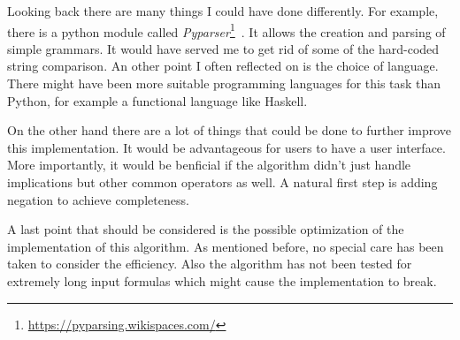 Looking back there are many things I could have done differently. For example, there is a python module called \emph{Pyparser}\footnote{\href{https://pyparsing.wikispaces.com/}{https://pyparsing.wikispaces.com/}}~. It allows the creation and parsing of simple grammars. It would have served me to get rid of some of the hard-coded string comparison. An other point I often reflected on is the choice of language. There might have been more suitable programming languages for this task than Python, for example a functional language like Haskell. 

On the other hand there are a lot of things that could be done to further improve this implementation. It would be advantageous for users to have a user interface. More importantly, it would be benficial if the algorithm didn't just handle implications but other common operators as well. A natural first step is adding negation to achieve completeness.

A last point that should be considered is the possible optimization of the implementation of this algorithm. As mentioned before, no special care has been taken to consider the efficiency. Also the algorithm has not been tested for extremely long input formulas which might cause the implementation to break. 